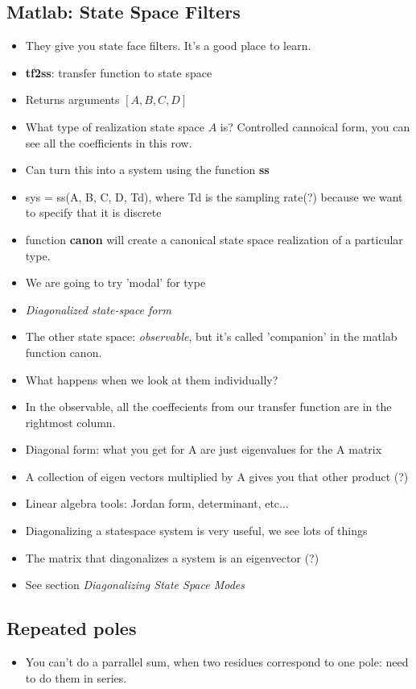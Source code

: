 \subsection*{Matlab: State Space Filters}
\begin{itemize}
\item{They give you state face filters. It's a good place to learn.}
\item{\textbf{tf2ss}: transfer function to state space}
\item{Returns arguments $[A, B, C, D]$}
\item{What type of realization state space $A$ is? Controlled cannoical form, you can see all the coefficients in this row.}
\item{Can turn this into a system using the function \textbf{ss}}
\item{sys = ss(A, B, C, D, Td), where Td is the sampling rate(?) because we want to specify 
that it is discrete}
\item{function \textbf{canon} will create a canonical state space 
realization of a particular type.}
\item{We are going to try 'modal' for type}
\item{\textit{Diagonalized state-space form}}
\item{The other state space: \textit{observable}, but it's called 'companion' in the matlab function canon.}
\item{What happens when we look at them individually?}
\item{In the observable, all the coeffecients from our transfer function are in the rightmost column.}
\item{Diagonal form: what you get for A are just eigenvalues for the A matrix}
\item{A collection of eigen vectors multiplied by A gives you that other product (?)}
\item{Linear algebra tools: Jordan form, determinant, etc...}
\item{Diagonalizing a statespace system is very useful, we see lots of things}
\item{The matrix that diagonalizes a system is an eigenvector (?)}
\item{See section \textit{Diagonalizing State Space Modes}}
\end{itemize}
\subsection*{Repeated poles}
\begin{itemize}
\item{You can't do a parrallel sum, when two residues correspond to one pole: need to do 
them in series.}
\end{itemize}

